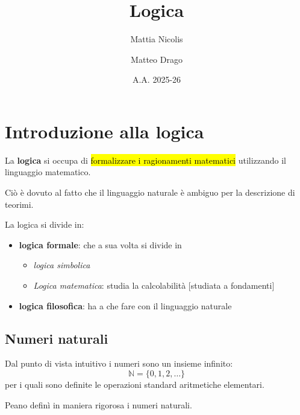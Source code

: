 \documentclass[a4paper, 12pt]{book}
\title{\textbf{Logica}}
\author{Mattia Nicolis \and Matteo Drago}
\date{A.A. 2025-26}
\begin{document}
  \maketitle
  \tableofcontents
  \markboth{}{}

  \chapter*{Introduzione alla logica}
  La \textbf{logica} si occupa di \hl{formalizzare i ragionamenti matematici} utilizzando il linguaggio matematico.

  Ciò è dovuto al fatto che il linguaggio naturale è ambiguo per la descrizione di teorimi.

  La logica si divide in:
  \begin{itemize}
    \item \textbf{logica formale}: che a sua volta si divide in
    \begin{itemize}
      \item \textit{logica simbolica}
      \item \textit{Logica matematica}: studia la calcolabilità [studiata a fondamenti] 
    \end{itemize}
    \item \textbf{logica filosofica}: ha a che fare con il linguaggio naturale
  \end{itemize}

  \section*{Numeri naturali}
  Dal punto di vista intuitivo i numeri sono un insieme infinito:
  \begin{equation*}
    \mathbb{N} = \{0, 1, 2, \dots\}
  \end{equation*}
  per i quali sono definite le operazioni standard aritmetiche elementari.

  Peano definì in maniera rigorosa i numeri naturali.
\end{document}
